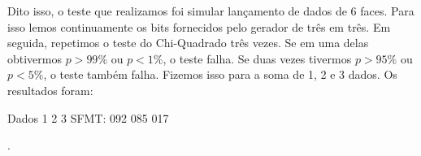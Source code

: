 Dito isso, o teste que realizamos foi simular lançamento de dados de 6
faces. Para isso lemos continuamente os bits fornecidos pelo gerador
de três em três. Em seguida, repetimos o teste do Chi-Quadrado três
vezes. Se em uma delas obtivermos $p > 99\%$ ou $p < 1\%$, o teste
falha. Se duas vezes tivermos $p> 95\%$ ou $p < 5\%$, o teste também
falha. Fizemos isso para a soma de 1, 2 e 3 dados. Os resultados
foram:

Dados    1   2    3    
SFMT:  092 085  017




.

\fim

